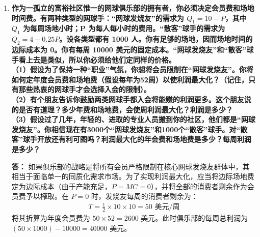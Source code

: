 \begin{enumerate}[label=\textbf{\arabic*.}, leftmargin=*]
\begin{center}
		\end{center}
		
		\item \textbf{作为一孤立的富裕社区惟一的网球俱乐部的拥有者，你必须决定会员费和场地时间费。有两种类型的网球手：“网球发烧友”的需求为 $Q_1 = 10 - P$，其中 $Q_1$ 为每周场地小时；P 为每人每小时的费用。“散客”球手的需求为 $Q_2 = 4 - 0.25P$。设各类型都有 1000 人。你有足够的场地，因而场地时间的边际成本为 0。你有每周 10000 美元的固定成本。“网球发烧友”和“散客”球手看上去是类似，所以你必须给他们定同样的价格。\\（1）假设为了保持一种“职业”气氛，你想将会员限制在“网球发烧友”。你将如何定年度会员费和场地费（假设每年为52周）以使利润最大化？（记住，只有那些热衷的网球手才会选择入会的限制）。\\（2）有个朋友告诉你鼓励两类网球手都入会将能赚的利润更多。这个朋友说的是否有道理？多少年费和场地费，会使周利润最大化？利润是多少？\\（3）假设过了几年，年轻的、进取的专业人员搬到你的社区，他们都是“网球发烧友”。你相信现在有3000个“网球发烧友”和1000个“散客”球手。对“散客”球手开放还有利可图吗？利润最大化的年会费和场地费是多少？每周利润是多少？}
		
		\textbf{答：}
		如果俱乐部的战略是将所有会员严格限制在核心网球发烧友群体中，其相当于面临单一的同质化需求市场。为了实现利润最大化，应当将边际场地费定为边际成本（由于产能充足，$P=MC=0$），并将全部的消费者剩余作为会员费予以榨取。在 $P=0$ 时，发烧友每周的消费者剩余为：
		\[
		\begin{aligned}
			T = \frac{1}{2} \times 10 \times 10 = 50 \text{ 美元/周}
		\end{aligned}
		\]
		将其折算为年度会员费为 $50 \times 52 = 2600$ 美元。此时俱乐部的每周总利润为 $(50 \times 1000) - 10000 = 40000$ 美元。
		

\end{enumerate}
